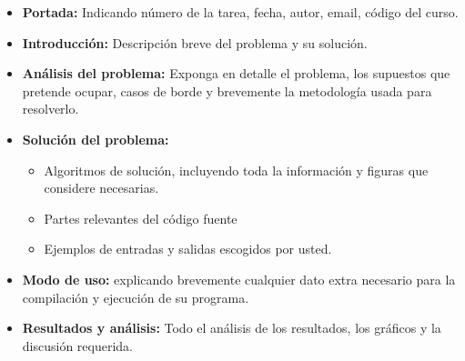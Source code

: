 \documentclass[dcc]{fcfmcourse}
\begin{document}
\begin{itemize}
    \item \textbf{Portada:} Indicando número de la tarea, fecha, autor, email, código del curso.
    \item \textbf{Introducción:} Descripción breve del problema y su solución.
    \item \textbf{Análisis del problema:} Exponga en detalle el problema, los supuestos que pretende ocupar, casos de borde y brevemente la metodología usada para resolverlo.
    \item \textbf{Solución del problema:}
    \begin{itemize}
        \item Algoritmos de solución, incluyendo toda la información y figuras que considere necesarias.
        \item Partes relevantes del código fuente
        \item Ejemplos de entradas y salidas escogidos por usted.
    \end{itemize}
    \item \textbf{Modo de uso:} explicando brevemente cualquier dato extra necesario para la compilación y ejecución de su programa.
    \item \textbf{Resultados y análisis:} Todo el análisis de los resultados, los gráficos y la discusión requerida.
\end{itemize}
\end{document}
